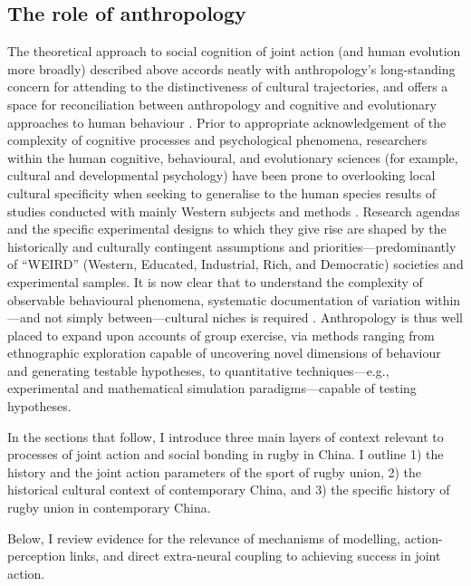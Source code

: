 \begin{CJK}{UTF8}{gbsn}
  \subsection{The role of anthropology}
  The theoretical approach to social cognition of joint action (and human evolution more broadly) described above accords neatly with anthropology's long-standing concern for attending to the distinctiveness of cultural trajectories, and offers a space for reconciliation between anthropology and cognitive and evolutionary approaches to human behaviour \citep{Whitehouse2012}.  Prior to appropriate acknowledgement of the complexity of cognitive processes and psychological phenomena, researchers within the human cognitive, behavioural, and evolutionary sciences (for example, cultural and developmental psychology) have been prone to overlooking local cultural specificity when seeking to generalise to the human species results of studies conducted with mainly Western subjects and methods \citep{Henrich2010d}.  Research agendas and the specific experimental designs to which they give rise are shaped by the historically and culturally contingent assumptions and priorities---predominantly of ``WEIRD'' (Western, Educated, Industrial, Rich, and Democratic) societies and experimental samples.  It is now clear that to understand the complexity of observable behavioural phenomena, systematic documentation of variation within---and not simply between---cultural niches is required \citep{Fuentes2016}.  Anthropology is thus well placed to expand upon accounts of group exercise, via methods ranging from ethnographic exploration capable of uncovering novel dimensions of behaviour and generating testable hypotheses, to quantitative techniques---e.g., experimental and mathematical simulation paradigms---capable of testing hypotheses.

  In the sections that follow, I introduce three main layers of context relevant to processes of joint action and social bonding in rugby in China.  I outline 1) the history and the joint action parameters of the sport of rugby union, 2) the historical cultural context of contemporary China, and 3) the specific history of rugby union in contemporary China.













  Below, I review evidence for the relevance of mechanisms of  modelling, action-perception links, and direct extra-neural coupling to achieving success in joint action.


\end{CJK}
